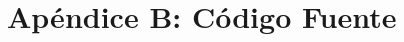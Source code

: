 \documentclass[a4paper,10pt,twoside]{article}
\begin{document}




\newpage

\section{Apéndice B: Código Fuente}









\end{document}
